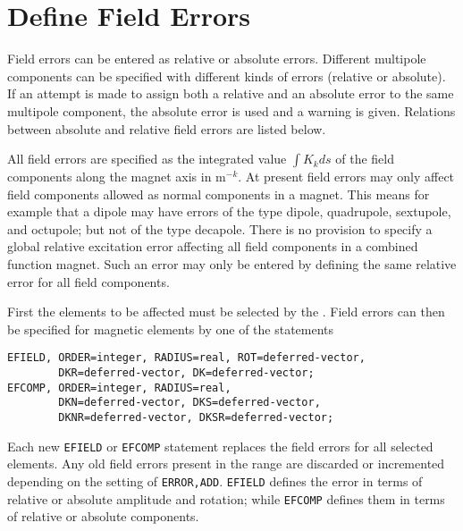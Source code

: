 \section{Define Field Errors}
\label{sec:errorfield}

Field errors can be entered as relative or absolute errors.
Different multipole components can be specified with
different kinds of errors (relative or absolute).
If an attempt is made to assign both a relative
and an absolute error to the same multipole component,
the absolute error is used and a warning is given.
Relations between absolute and relative field errors are listed below.

All field errors are specified as the integrated value $\int K_k ds$ of the 
field components along the magnet axis in $\mathrm{m}^{-k}$.
At present field errors may only affect field components
allowed as normal components in a magnet.
This means for example that a dipole may have errors of the type dipole,
quadrupole, sextupole, and octupole; but not of the type decapole.
There is no provision to specify a global relative
excitation error affecting all field components in a combined function
magnet.
Such an error may only be entered by defining the same relative error
for all field components.

First the elements to be affected must be selected by the 
.
Field errors can then be specified for magnetic elements
by one of the statements
\begin{verbatim}
EFIELD, ORDER=integer, RADIUS=real, ROT=deferred-vector,
        DKR=deferred-vector, DK=deferred-vector;
EFCOMP, ORDER=integer, RADIUS=real,
        DKN=deferred-vector, DKS=deferred-vector,
        DKNR=deferred-vector, DKSR=deferred-vector;
\end{verbatim}
Each new \texttt{EFIELD} or \texttt{EFCOMP} statement
replaces the field errors for all selected elements.
Any old field errors present in the range are discarded
or incremented depending on the setting of \texttt{ERROR,ADD}.
\texttt{EFIELD} defines the error in terms 
of relative or absolute amplitude and rotation;
while \texttt{EFCOMP} defines them in terms 
of relative or absolute components.

